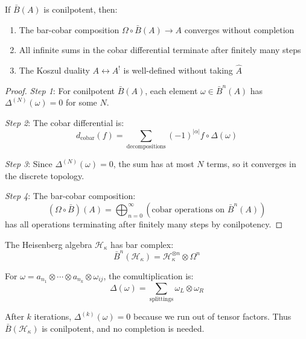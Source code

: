 \begin{theorem}
\label{thm:conilpotency-convergence}
\label{thm:conilpotency-bar}
\label{thm:koszul-conilpotent}
If $\bar{B}(A)$ is conilpotent, then:
\begin{enumerate}
\item The bar-cobar composition $\Omega \circ \bar{B}(A) \to A$ converges without completion
\item All infinite sums in the cobar differential terminate after finitely many steps
\item The Koszul duality $A \leftrightarrow A^!$ is well-defined without taking $\hat{A}$
\end{enumerate}
\end{theorem}

\begin{proof}
\emph{Step 1}: For conilpotent $\bar{B}(A)$, each element $\omega \in \bar{B}^n(A)$ 
has $\Delta^{(N)}(\omega) = 0$ for some $N$.

\emph{Step 2}: The cobar differential is:
\begin{equation}
d_{\text{cobar}}(f) = \sum_{\text{decompositions}} (-1)^{|\alpha|} f \circ \Delta(\omega)
\end{equation}

\emph{Step 3}: Since $\Delta^{(N)}(\omega) = 0$, the sum has at most $N$ terms, so 
it converges in the discrete topology.

\emph{Step 4}: The bar-cobar composition:
\begin{equation}
(\Omega \circ \bar{B})(A) = \bigoplus_{n=0}^\infty (\text{cobar operations on } 
\bar{B}^n(A))
\end{equation}
has all operations terminating after finitely many steps by conilpotency.
\end{proof}

\begin{example}
\label{ex:heisenberg-conilpotent-complete}
The Heisenberg algebra $\mathcal{H}_\kappa$ has bar complex:
\begin{equation}
\bar{B}^n(\mathcal{H}_\kappa) = \mathcal{H}_\kappa^{\otimes n} \otimes \Omega^n
\end{equation}

For $\omega = a_{n_1} \otimes \cdots \otimes a_{n_k} \otimes \omega_{ij}$, the 
comultiplication is:
\begin{equation}
\Delta(\omega) = \sum_{\text{splittings}} \omega_L \otimes \omega_R
\end{equation}

After $k$ iterations, $\Delta^{(k)}(\omega) = 0$ because we run out of tensor factors. 
Thus $\bar{B}(\mathcal{H}_\kappa)$ is conilpotent, and no completion is needed.
\end{example}

